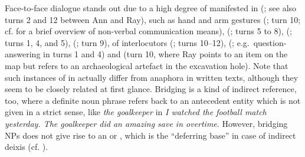 \documentclass[output=paper
 	        ,biblatex
                ,babelshorthands
                ,newtxmath
                ,draftmode
                ,colorlinks, citecolor=brown
]{langscibook}
\begin{document}
Face-to-face dialogue stands out due to a high degree of  manifested in  (\citealt{Tomasello:1998}; see also turns 2 and 12 between Ann and Ray),  such as hand and arm gestures (\citealt{Kendon:2004,McNeill:2000:a}; turn 10; cf.  for a brief overview of non-verbal communication means),  (\citealp{Ginzburg:Fernandez:Schlangen:2014}; turns 5 to 8),  (\citealp{Fernandez:Ginzburg:2002,Fernandez:Ginzburg:Lappin:2007}; turns 1, 4, and 5),  (\citealp{Ginzburg:Breitholz:Cooper:Hough:Tian:2015}; turn 9),  of interlocutors (\citealp{Clark:Schreuder:Buttrick:1983}; turns 10--12),  (\citealp{Sacks:Schegloff:Jefferson:1974,heldner2010,levinson2015}; e.g.\ question-answering in turns 1 and 4) and  (turn 10, where Ray points to an item on the map but refers to an archaeological artefact in the excavation hole). Note that such instances of  \citep{Nunberg:1993} in  actually differ from  anaphora \citep{Clark:1975}  in written texts, although they seem to be closely related at first glance. Bridging is a kind of indirect reference, too, where a definite noun phrase refers back to an antecedent entity which is not given in a strict sense, like \textit{the goalkeeper} in \textit{I watched the football match yesterday. The goalkeeper did an amazing save in overtime}. However, bridging NPs does not give rise to an  or , which is the \enquote{deferring base} in case of indirect deixis (cf. \citealp{Luecking:2018:a}).
\end{document}
